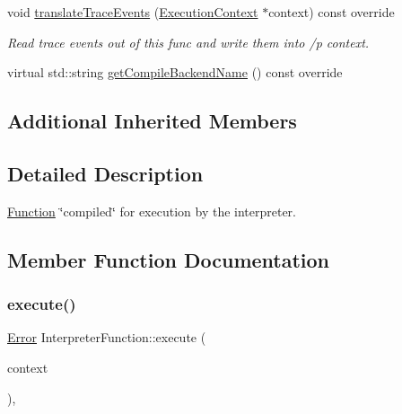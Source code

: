 \begin{Indent}
\begin{DoxyCompactItemize}
\mbox{\label{classglow_1_1_interpreter_function_af1a7932b05fac2cefa0a7859f3a40ce3}} 
void \hyperlink{classglow_1_1_interpreter_function_af1a7932b05fac2cefa0a7859f3a40ce3}{translate\+Trace\+Events} (\hyperlink{classglow_1_1_execution_context}{Execution\+Context} $\ast$context) const override
\begin{DoxyCompactList}\small\item\em Read trace events out of this func and write them into /p context. \end{DoxyCompactList}\item 
virtual std\+::string \hyperlink{classglow_1_1_interpreter_function_a7fe37f3e6fe47a7806ecc1cb6d05b2c2}{get\+Compile\+Backend\+Name} () const override
\end{DoxyCompactItemize}
\end{Indent}
\subsection*{Additional Inherited Members}


\subsection{Detailed Description}
\hyperlink{classglow_1_1_function}{Function} \char`\"{}compiled\char`\"{} for execution by the interpreter. 

\subsection{Member Function Documentation}
\mbox{\label{classglow_1_1_interpreter_function_a6bc0763da64f449b7fda842397fc7c86}} 
\subsubsection{\texorpdfstring{execute()}{execute()}}
{\footnotesize\ttfamily \hyperlink{namespaceglow_afdb176c3a672ef66db0ecfc19a8d39bf}{Error} Interpreter\+Function\+::execute (\begin{DoxyParamCaption}\item[{\hyperlink{classglow_1_1_execution_context}{Execution\+Context} $\ast$}]{context }\end{DoxyParamCaption})\hspace{0.3cm}{\ttfamily [override]}, {\ttfamily [virtual]}}

